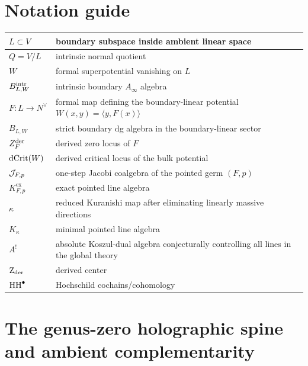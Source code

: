 \appendix

\section{Notation guide}

\begin{center}
\renewcommand{\arraystretch}{1.2}
\begin{longtable}{|p{}|p{}|}
\hline
$L\subset V$ & boundary subspace inside ambient linear space \\
\hline
$Q=V/L$ & intrinsic normal quotient \\
\hline
$W$ & formal superpotential vanishing on $L$ \\
\hline
$B^{\mathrm{intr}}_{L,W}$ & intrinsic boundary $A_\infty$ algebra \\
\hline
$F:L\to N^\vee$ & formal map defining the boundary-linear potential $W(x,y)=\langle y,F(x)\rangle$ \\
\hline
$B_{L,W}$ & strict boundary dg algebra in the boundary-linear sector \\
\hline
$Z_F^{\mathrm{der}}$ & derived zero locus of $F$ \\
\hline
$\operatorname{dCrit}(W)$ & derived critical locus of the bulk potential \\
\hline
$\mathcal J_{F,p}$ & one-step Jacobi coalgebra of the pointed germ $(F,p)$ \\
\hline
$K^{\mathrm{ex}}_{F,p}$ & exact pointed line algebra \\
\hline
$\kappa$ & reduced Kuranishi map after eliminating linearly massive directions \\
\hline
$K_\kappa$ & minimal pointed line algebra \\
\hline
$A^!$ & absolute Koszul-dual algebra conjecturally controlling all lines in the global theory \\
\hline
$\operatorname{Z}_{\mathrm{der}}$ & derived center \\
\hline
$\operatorname{HH}^\bullet$ & Hochschild cochains/cohomology \\
\hline
\end{longtable}
\end{center}




\section{The genus-zero holographic spine and ambient complementarity}


